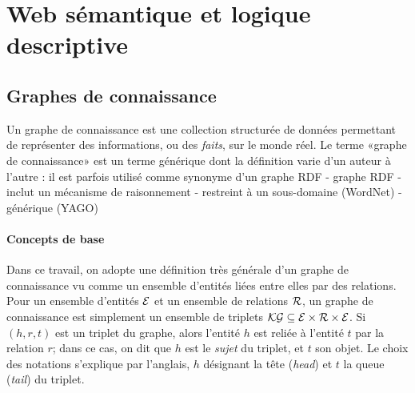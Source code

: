 \label{chap:revue}


\section{Web sémantique et logique descriptive}
\label{sec:dl}

\subsection{Graphes de connaissance}




Un graphe de connaissance est une collection structurée de données permettant de représenter des informations, ou des \textit{faits}, sur le monde réel. Le terme «graphe de connaissance» est un terme générique dont la définition varie d'un auteur à l'autre \cite{ehrlinger2016towards} : il est parfois utilisé comme synonyme d'un graphe RDF
- graphe RDF
- inclut un mécanisme de raisonnement
- restreint à un sous-domaine (WordNet)
- générique (YAGO)



\paragraph{Concepts de base}

Dans ce travail, on adopte une définition très générale d'un graphe de connaissance vu comme un ensemble d'entités liées entre elles par des relations. Pour un ensemble d'entités $\mathcal{E}$ et un ensemble de relations $\mathcal{R}$, un graphe de connaissance est simplement un ensemble de triplets $\mathcal{KG} \subseteq \mathcal{E} \times \mathcal{R} \times \mathcal{E}$. Si $(h, r, t)$ est un triplet du graphe, alors l'entité $h$ est reliée à l'entité $t$ par la relation $r$; dans ce cas, on dit que $h$ est le \textit{sujet} du triplet, et $t$ son objet. Le choix des notations s'explique par l'anglais, $h$ désignant la tête (\textit{head}) et $t$ la queue (\textit{tail}) du triplet. 

